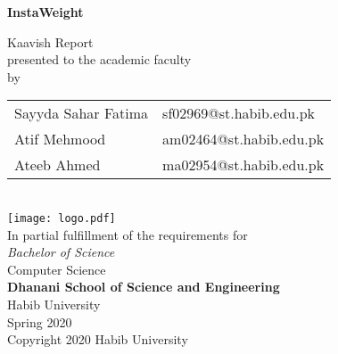 \begin{titlepage}
  
  \begin{center}
    
    \textbf{\Huge InstaWeight}
	
    {\large Kaavish Report\\
      presented to the academic faculty\\
      by\\\bigskip
      \begin{tabular}{ll}
       Sayyda Sahar Fatima & sf02969@st.habib.edu.pk\\
       Atif Mehmood & am02464@st.habib.edu.pk\\
       Ateeb Ahmed & ma02954@st.habib.edu.pk\\
       
      \end{tabular}
    }\\\vfill
    \texttt{[image: logo.pdf]}\\
    {\large In partial fulfillment of the requirements for\\
      \textit{Bachelor of Science}\\
      Computer Science\\\medskip
      \textbf{Dhanani School of Science and Engineering}\\\medskip
      Habib University\\\smallskip
      Spring 2020
    }\\\vfill
    Copyright {\scriptsize \textcopyright} 2020 Habib University
  \end{center}
  \restoregeometry
  \newpage
  \newpage
  
\end{titlepage}




